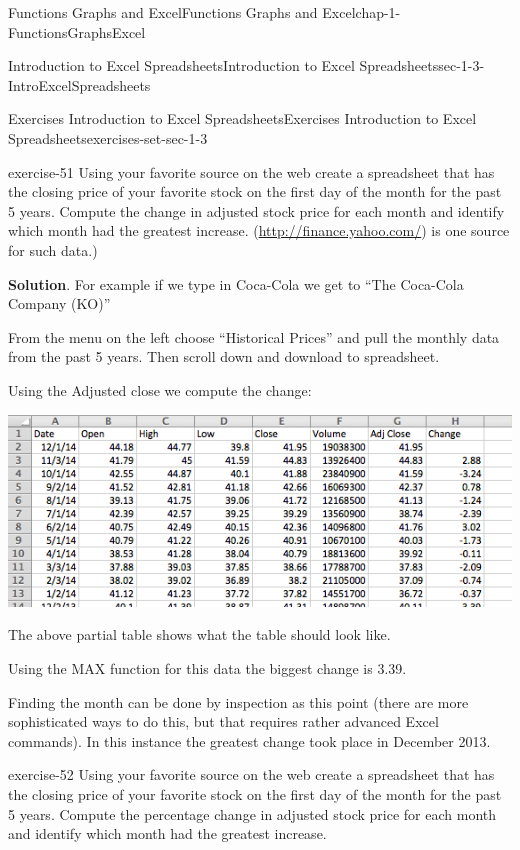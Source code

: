 \documentclass[oneside,10pt,]{book}
\numberwithin{equation}{section}
\begin{document}
\begin{chapterptx}{Functions Graphs and Excel}{}{Functions Graphs and Excel}{}{}{chap-1-FunctionsGraphsExcel}
\begin{sectionptx}{Introduction to Excel Spreadsheets}{}{Introduction to Excel Spreadsheets}{}{}{sec-1-3-IntroExcelSpreadsheets}
\begin{exercises-subsection-numberless}{Exercises Introduction to Excel Spreadsheets}{}{Exercises Introduction to Excel Spreadsheets}{}{}{exercises-set-sec-1-3}
\begin{divisionexercise}{9}{}{}{exercise-51}
Using your favorite source on the web create a spreadsheet that has the closing price of your favorite stock on the first day of the month for the past 5 years.  Compute the change in adjusted stock price for each month and identify which month had the greatest increase. (\href{http://finance.yahoo.com/}{http:\slash{}\slash{}finance.yahoo.com\slash{}}) is one source for such data.)%
\par\smallskip%
\noindent\textbf{Solution}.\hypertarget{solution-26}{}\quad%
\hypertarget{p-305}{}%
For example if we type in Coca-Cola we get to ``The Coca-Cola Company (KO)''%
\par
\hypertarget{p-306}{}%
From the menu on the left choose “Historical Prices” and pull the monthly data from the past 5 years. Then scroll down and download to spreadsheet.%
\par
\hypertarget{p-307}{}%
Using the Adjusted close we compute the change: \leavevmode%
\begin{sidebyside}{1}{0.1}{0.1}{0}%
\begin{sbspanel}{0.8}%
\includegraphics[width=1\linewidth]{images/sec1-3-sol9a.png}
\end{sbspanel}%
\end{sidebyside}%
%
\par
\hypertarget{p-308}{}%
The above partial table shows what the table should look like.%
\par
\hypertarget{p-309}{}%
Using the MAX function for this data the biggest change is \textdollar{}3.39.%
\par
\hypertarget{p-310}{}%
Finding the month can be done by inspection as this point (there are more sophisticated ways to do this, but that requires rather advanced Excel commands). In this instance the greatest change took place in December 2013.%
\end{divisionexercise}%
\begin{divisionexercise}{10}{}{}{exercise-52}%
\hypertarget{p-311}{}%
Using your favorite source on the web create a spreadsheet that has the closing price of your favorite stock on the first day of the month for the past 5 years.  Compute the percentage change in adjusted stock price for each month and identify which month had the greatest increase.%

\end{divisionexercise}
\end{exercises-subsection-numberless}
\end{sectionptx}
\end{chapterptx}
\end{document}
